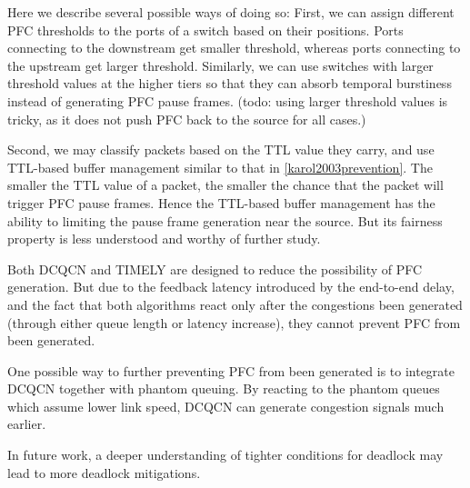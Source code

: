 Here we describe several possible ways of doing so: First, we can assign different PFC thresholds to the ports of a switch based on their positions. Ports connecting to the downstream get smaller threshold, whereas ports connecting to the upstream get larger threshold. %
Similarly, we can use switches with larger threshold values at the higher tiers so that they can absorb temporal burstiness instead of generating PFC pause frames.  (todo: using larger threshold values is tricky, as it does not push PFC back to the source for all cases.)


Second, we may classify packets based on the TTL value they carry, and use TTL-based buffer management similar to that in \ref{karol2003prevention}. The smaller the TTL value of a packet, the smaller the chance that the packet will trigger PFC pause frames. Hence the TTL-based buffer management has the ability to limiting the pause frame generation near the source. But its fairness property is less understood and worthy of further study.

Both DCQCN and TIMELY are designed to reduce the possibility of PFC generation. But due to the feedback latency introduced by the end-to-end delay, and the fact that both algorithms react only after the congestions been generated (through either queue length or latency increase), they cannot prevent PFC from been generated. 

One possible way to further preventing PFC from been generated is to integrate DCQCN together with phantom queuing. By reacting to the phantom queues which assume lower link speed, DCQCN can generate congestion signals much earlier. 

In future work, a deeper understanding of tighter conditions for deadlock may
lead to more deadlock mitigations. 